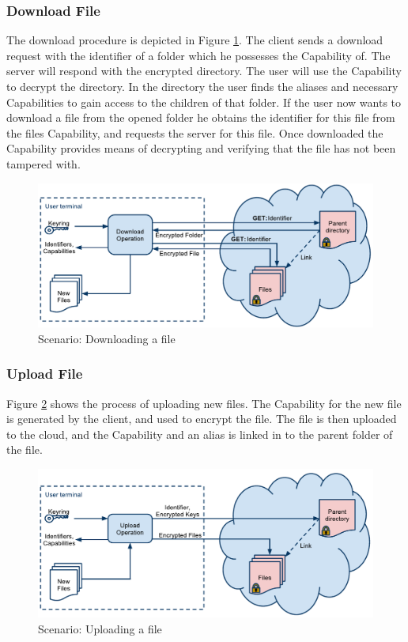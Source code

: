 \documentclass[pdftex,english,10pt,b5paper,twoside]{book}
\begin{document}
\subsubsection{Download File}

The download procedure is depicted in Figure \ref{fig:AS:download}.  The client
sends a download request with the identifier of a folder which he possesses the
Capability of. The server will respond with the encrypted directory. The user
will use the Capability to decrypt the directory. In the directory the user
finds the aliases and necessary Capabilities to gain access to the children of
that folder. If the user now wants to download a file from the opened folder he
obtains the identifier for this file from the files Capability, and requests
the server for this file. Once downloaded the Capability provides means of
decrypting and verifying that the file has not been tampered with.

\begin{figure}[h!]
    \centering
    \includegraphics[width=\columnwidth]{ArchitectureDownload.pdf}
    \caption{Scenario: Downloading a file}
    \label{fig:AS:download}
\end{figure}

\subsubsection{Upload File}

Figure \ref{fig:AS:upload} shows the process of uploading new files. The
Capability for the new file is generated by the client, and used to encrypt the
file. The file is then uploaded to the cloud, and the Capability and an alias
is linked in to the parent folder of the file. 

\begin{figure}[h!]
    \centering
    \includegraphics[width=\columnwidth]{ArchitectureUpload.pdf}
    \caption{Scenario: Uploading a file}
    \label{fig:AS:upload}
\end{figure}
\end{document}

